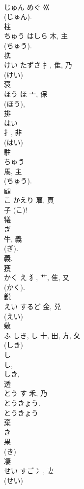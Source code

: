 \documentclass[8pt]{extreport}
\begin{document}
\begin{CJK}{UTF8}{min}
\\	じゅん	めぐ	巛		
\\	(じゅん). 
\\	柱	
\\	ちゅう	はしら	木, 主	
\\	(ちゅう). 
\\	携	
\\	けい	たずさ	扌, 隹, 乃	
\\	(けい) 
\\	褒	
\\	ほう	ほ	亠, 保		
\\	(ほう), 
\\	排	
\\	はい	
\\	扌, 非	
\\	(はい) 
\\	駐	
\\	ちゅう	
\\	馬, 主	
\\	(ちゅう). 
\\	顧	
\\	こ	かえり	雇, 頁	
\\	子 (こ)!	
\\	犠	
\\	ぎ	
\\	牛, 義	
\\	(ぎ). 
\\	義. 
\\	獲	
\\	かく	え	犭, 艹, 隹, 又	
\\	(かく). 
\\	鋭	
\\	えい	するど	金, 兑	
\\	(えい) 
\\	敷	
\\	ふ	しき, し	十, 田, 方, 夂	
\\	(しき) 
\\	し 
\\	し, 
\\	しき, 
\\	透	
\\	とう	す	禾, 乃		
\\	とうきょう. 
\\	とうきょう 
\\	棄	
\\	き	
\\	果		
\\	(き) 
\\	凄	
\\	せい	すご	冫, 妻	
\\	(せい) 

\end{CJK}
\end{document}
